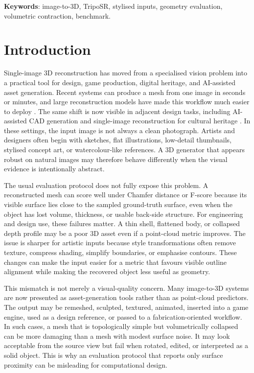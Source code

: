 \documentclass[12pt,a4paper]{article}
\begin{document}
\textbf{Keywords}: image-to-3D, TripoSR, stylised inputs, geometry evaluation, volumetric contraction, benchmark.

\section{Introduction}

Single-image 3D reconstruction has moved from a specialised vision problem into a practical tool for design, game production, digital heritage, and AI-assisted asset generation. Recent systems can produce a mesh from one image in seconds or minutes, and large reconstruction models have made this workflow much easier to deploy \parencite{hong2023lrm,tochilkin2024triposr,xu2024instantmesh}. The same shift is now visible in adjacent design tasks, including AI-assisted CAD generation and single-image reconstruction for cultural heritage \parencite{doris2026cadbench,wu2026culturalrelics}. In these settings, the input image is not always a clean photograph. Artists and designers often begin with sketches, flat illustrations, low-detail thumbnails, stylised concept art, or watercolour-like references. A 3D generator that appears robust on natural images may therefore behave differently when the visual evidence is intentionally abstract.

The usual evaluation protocol does not fully expose this problem. A reconstructed mesh can score well under Chamfer distance or F-score because its visible surface lies close to the sampled ground-truth surface, even when the object has lost volume, thickness, or usable back-side structure. For engineering and design use, these failures matter. A thin shell, flattened body, or collapsed depth profile may be a poor 3D asset even if a point-cloud metric improves. The issue is sharper for artistic inputs because style transformations often remove texture, compress shading, simplify boundaries, or emphasise contours. These changes can make the input easier for a metric that favours visible outline alignment while making the recovered object less useful as geometry.

This mismatch is not merely a visual-quality concern. Many image-to-3D systems are now presented as asset-generation tools rather than as point-cloud predictors. The output may be remeshed, sculpted, textured, animated, inserted into a game engine, used as a design reference, or passed to a fabrication-oriented workflow. In such cases, a mesh that is topologically simple but volumetrically collapsed can be more damaging than a mesh with modest surface noise. It may look acceptable from the source view but fail when rotated, edited, or interpreted as a solid object. This is why an evaluation protocol that reports only surface proximity can be misleading for computational design.
\end{document}
